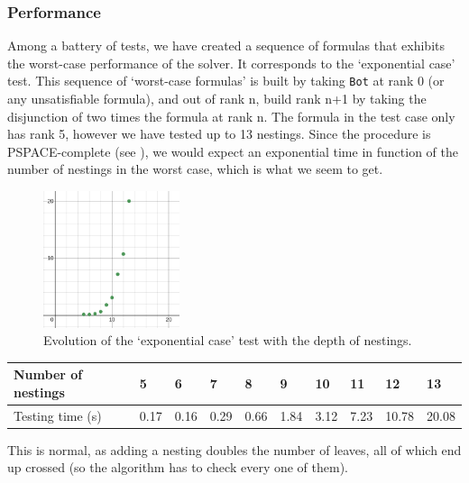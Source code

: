 \documentclass[11pt]{article}
\theoremstyle{definition}
\begin{document}
\subsubsection*{Performance}
Among a battery of tests, we have created a sequence of formulas that exhibits the worst-case performance of the solver. 
It corresponds to the `exponential case' test. This sequence of `worst-case formulas' 
is built by taking {\tt Bot} at rank 0 (or any unsatisfiable formula), and out of rank n, 
build rank n+1 by taking the disjunction of two times the formula at rank n. 
The formula in the test case only has rank 5, however we have tested up to 13 nestings. 
Since the procedure is PSPACE-complete (see \cite[Section 9]{ReyLTL}), 
we would expect an exponential time in function of the number of nestings in the worst case, 
which is what we seem to get. 

\begin{figure}[h!]\label{fig:graph_perf}
    \centering
    \includegraphics[width = 4cm]{graph_perf.png}
    \caption{Evolution of the `exponential case' test with the depth of nestings.}
\end{figure}
\begin{table}[h!]
    \centering
    \begin{tabular}{|l|l|l|l|l|l|l|l|l|l|}
    \hline
    Number of nestings & 5    & 6    & 7    & 8    & 9    & 10   & 11   & 12    & 13    \\ \hline
    Testing time (s)   & 0.17 & 0.16 & 0.29 & 0.66 & 1.84 & 3.12 & 7.23 & 10.78 & 20.08 \\ \hline
    \end{tabular}
\end{table}




This is normal, as adding a nesting doubles the number of leaves, 
all of which end up crossed (so the algorithm has to check every one of them).
\end{document}
